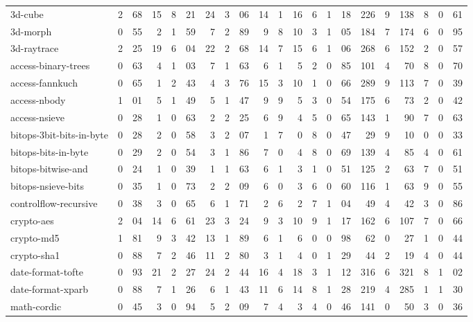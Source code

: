 \begin{figure*}[ht]
\begin{tabular}{lr@{.}lrr@{.}lrr@{.}lr@{.}lr@{.}lr@{.}lr@{.}lr@{.}lr@{.}l}
3d-cube                  & 2&68 & 15 & 8&21 & 24 & 3&06
    & 14&1 & 16&6 & 1&18 & 226&9 & 138&8 & 0&61 \\
3d-morph                 & 0&55 & 2   & 1&59 & 7  & 2&89 
    & 9&8  & 10&3 & 1&05 & 184&7 & 174&6 & 0&95 \\
3d-raytrace              & 2&25 & 19 & 6&04 & 22 & 2&68
    & 14&7 & 15&6 & 1&06 & 268&6 & 152&2 & 0&57 \\
access-binary-trees      & 0&63 & 4   & 1&03 & 7  & 1&63
    & 6&1  & 5&2 & 0&85   & 101&4 & 70&8  & 0&70 \\
access-fannkuch          & 0&65  & 1  & 2&43 & 4  & 3&76
    & 15&3 & 10&1 & 0&66  & 289&9 & 113&7 & 0&39 \\
access-nbody             & 1&01 & 5  & 1&49 & 5  & 1&47
    & 9&9  & 5&3 & 0&54   & 175&6 & 73&2  & 0&42 \\
access-nsieve            & 0&28 & 1   & 0&63 & 2   & 2&25
    & 6&9  & 4&5 & 0&65   & 143&1 & 90&7  & 0&63 \\
bitops-3bit-bits-in-byte & 0&28 & 2   & 0&58 & 3   & 2&07
    & 1&7  & 0&8 & 0&47    & 29&9 & 10&0   & 0&33 \\
bitops-bits-in-byte      & 0&29 & 2   & 0&54 & 3   & 1&86
    & 7&0  & 4&8 & 0&69   & 139&4 & 85&4  & 0&61 \\
bitops-bitwise-and       & 0&24 & 1   & 0&39 & 1   & 1&63
    & 6&1  & 3&1 & 0&51   & 125&2 & 63&7  & 0&51 \\
bitops-nsieve-bits       & 0&35 & 1   & 0&73 & 2   & 2&09
    & 6&0  & 3&6 & 0&60    & 116&1 & 63&9  & 0&55 \\
controlflow-recursive    & 0&38 & 3   & 0&65 & 6   & 1&71
    & 2&6  & 2&7 & 1&04  & 49&4  & 42&3  & 0&86 \\
crypto-aes               & 2&04 & 14 & 6&61 & 23 & 3&24
    & 9&3  & 10&9 & 1&17 & 162&6 & 107&7 & 0&66 \\
crypto-md5               & 1&81 & 9  & 3&42 & 13 & 1&89
    & 6&1  & 6&0 & 0&98   & 62&0  & 27&1  & 0&44 \\
crypto-sha1              & 0&88 & 7   & 2&46 & 11 & 2&80
    & 3&1  & 4&0 & 1&29  & 44&2  & 19&4  & 0&44 \\
date-format-tofte        & 0&93 & 21  & 2&27 & 24 & 2&44
    & 16&4 & 18&3 & 1&12 & 316&6 & 321&8 & 1&02 \\
date-format-xparb        & 0&88 & 7   & 1&26 & 6  & 1&43
    & 11&6 & 14&8 & 1&28 & 219&4 & 285&1 & 1&30 \\
math-cordic              & 0&45 & 3   & 0&94 & 5   & 2&09
    & 7&4  & 3&4 & 0&46   & 141&0 & 50&3  & 0&36 \\

\end{tabular}
\end{figure*}
